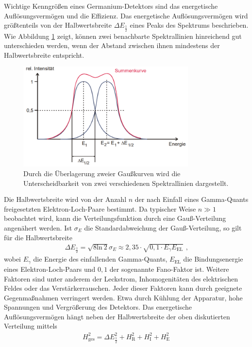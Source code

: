 Wichtige Kenngrößen eines Germanium-Detektors sind das energetische Auflösungsvermögen und die Effizienz.
Das energetische Auflösungsvermögen wird größtenteils von der Halbwertsbreite $\Delta E_{\frac{1}{2}}$ eines Peaks des Spektrums beschrieben.
Wie Abbildung \ref{fig:halbwertsbreite} zeigt, können zwei benachbarte Spektrallinien hinreichend gut unterschieden werden, wenn der Abstand zwischen ihnen mindestens der Halbwertsbreite entspricht.
\begin{figure}
\centering
\includegraphics[width=0.8\textwidth]{content/skizzen/halbwertsbreite.png}
\caption{Durch die Überlagerung zweier Gaußkurven wird die Unterscheidbarkeit von zwei verschiedenen Spektrallinien dargestellt.}
\label{fig:halbwertsbreite}
\end{figure}
Die Halbwertsbreite wird von der Anzahl $n$ der nach Einfall eines Gamma-Quants freigesetzten Elektron-Loch-Paare bestimmt.
Da typischer Weise $n\gg 1$ beobachtet wird, kann die Verteilungsfunktion durch eine Gauß-Verteilung angenähert werden.
Ist $\sigma_E$ die Standardabweichung der Gauß-Verteilung, so gilt für die Halbwertsbreite
\begin{align}
\Delta E_{\frac{1}{2}} = \sqrt{8 \text{ln} ~2} \sigma_E \approx 2,35 \cdot \sqrt{0,1 \cdot E_{\gamma} E_{\text{EL}}} \text{ ,}
\label{eq:t:halbwertsbreite}
\end{align}
wobei $E_{\gamma}$ die Energie des einfallenden Gamma-Quants, $E_{\text{EL}}$ die Bindungsenergie eines Elektron-Loch-Paars und $0,1$ der sogenannte Fano-Faktor ist.
Weitere Faktoren sind unter anderem der Leckstrom, Inhomogenitäten des elektrischen Feldes oder das Verstärkerrauschen.
Jeder dieser Faktoren kann durch geeignete Gegenmaßnahmen verringert werden.
Etwa durch Kühlung der Apparatur, hohe Spannungen und Vergrößerung des Detektors.
Das energetische Auflösungsvermögen hängt neben der Halbwertsbreite der oben diskutierten Verteilung mittels
\begin{align}
H_\text{ges}^2 = \Delta E_{\frac{1}{2}}^2 + H_\text{R}^2 + H_\text{I}^2 + H_\text{E}^2
\end{align}
